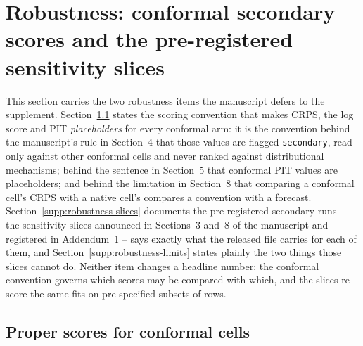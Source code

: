 %

\section{Robustness: conformal secondary scores and the pre-registered
  sensitivity slices}
\label{supp:robustness}

This section carries the two robustness items the manuscript defers to the
supplement. Section~\ref{supp:robustness-conformal} states the scoring
convention that makes CRPS, the log score and PIT \emph{placeholders} for
every conformal arm: it is the convention behind the manuscript's rule in
Section~4 that those values are flagged \texttt{secondary}, read only against
other conformal cells and never ranked against distributional mechanisms;
behind the sentence in Section~5 that conformal PIT values are placeholders;
and behind the limitation in Section~8 that comparing a conformal cell's CRPS
with a native cell's compares a convention with a forecast.
Section~\ref{supp:robustness-slices} documents the pre-registered secondary
runs -- the sensitivity slices announced in Sections~3 and~8 of the manuscript
and registered in Addendum~1 -- says exactly what the released file carries for
each of them, and Section~\ref{supp:robustness-limits} states plainly the two
things those slices cannot do. Neither item changes a headline number: the
conformal convention governs which scores may be compared with which, and the
slices re-score the same fits on pre-specified subsets of rows.

\subsection{Proper scores for conformal cells}
\label{supp:robustness-conformal}

